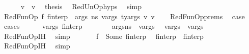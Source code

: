 \begin{isabellebody}
\ \ \ \ \isamarkupfalse%
\ {\isacartoucheopen}v{}\ {\isacharequal}{\kern0pt}\ v{\isacartoucheclose}\ \isamarkupfalse%
\ {\isacharquery}{\kern0pt}thesis\ \isamarkupfalse%
\ RedUnOp{\isachardot}{\kern0pt}hyps\ \isamarkupfalse%
\ simp\isanewline
\ \ \isamarkupfalse%
\isanewline
{}\isamarkupfalse%
\isanewline
\ \ \isamarkupfalse%
\ {\isacharparenleft}{\kern0pt}RedFunOp\ f\ f{\isacharunderscore}{\kern0pt}interp\ {\isasymOmega}\ args\ n{\isacharunderscore}{\kern0pt}s\ v{\isacharunderscore}{\kern0pt}args\ ty{\isacharunderscore}{\kern0pt}args\ v\ v{\isacharprime}{\kern0pt}{\isacharparenright}{\kern0pt}\isanewline
\ \ \isamarkupfalse%
\ RedFunOp{\isachardot}{\kern0pt}prems\ \isamarkupfalse%
\ {\isacharquery}{\kern0pt}case\isanewline
\ \ \isamarkupfalse%
\ {\isacharparenleft}{\kern0pt}cases{\isacharparenright}{\kern0pt}\isanewline
\ \ \ \ \isamarkupfalse%
\ v{\isacharunderscore}{\kern0pt}args{\isacharprime}{\kern0pt}\ f{\isacharunderscore}{\kern0pt}interp{\isacharprime}{\kern0pt}\isanewline
\ \ \ \ \isamarkupfalse%
\ {\isachardoublequoteopen}{\isasymLambda}{\isacharcomma}{\kern0pt}{\isasymGamma}{\isacharcomma}{\kern0pt}{\isasymOmega}\ {\isasymturnstile}\ {\isasymlangle}args{\isacharcomma}{\kern0pt}n{\isacharunderscore}{\kern0pt}s{\isasymrangle}\ {\isacharbrackleft}{\kern0pt}{\isasymDown}{\isacharbrackright}{\kern0pt}\ v{\isacharunderscore}{\kern0pt}args{\isacharprime}{\kern0pt}{\isachardoublequoteclose}\ \isamarkupfalse%
\ {\isachardoublequoteopen}v{\isacharunderscore}{\kern0pt}args\ {\isacharequal}{\kern0pt}\ v{\isacharunderscore}{\kern0pt}args{\isacharprime}{\kern0pt}{\isachardoublequoteclose}\ \isamarkupfalse%
\ RedFunOp{\isachardot}{\kern0pt}IH\ \isamarkupfalse%
\ simp\isanewline
\ \ \ \ \isamarkupfalse%
\ {\isachardoublequoteopen}{\isasymGamma}\ f\ {\isacharequal}{\kern0pt}\ Some\ f{\isacharunderscore}{\kern0pt}interp{\isacharprime}{\kern0pt}{\isachardoublequoteclose}\ \isamarkupfalse%
\ {\isachardoublequoteopen}f{\isacharunderscore}{\kern0pt}interp\ {\isacharequal}{\kern0pt}\ f{\isacharunderscore}{\kern0pt}interp{\isacharprime}{\kern0pt}{\isachardoublequoteclose}\ \isamarkupfalse%
\ RedFunOp{\isachardot}{\kern0pt}IH\ \isamarkupfalse%
\ simp\isanewline
\ \ \ \ \isamarkupfalse%

\end{isabellebody}
